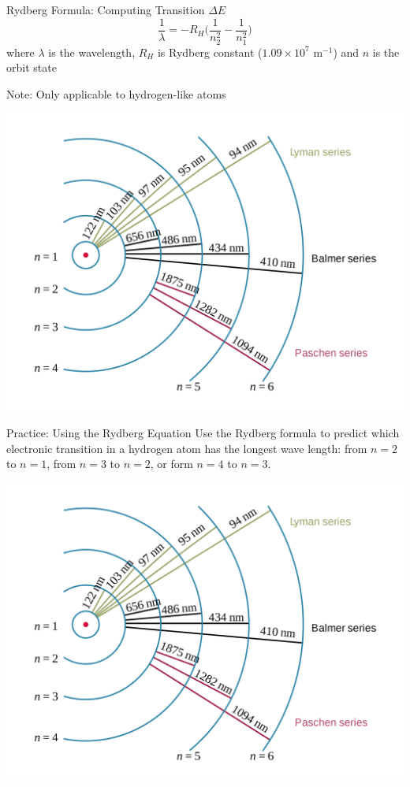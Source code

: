 \documentclass[11pt]{beamer}
\begin{document}
\begin{frame}{Rydberg Formula: Computing Transition $\Delta E$}
  \begin{equation}
    \frac{1}{\lambda} = -R_H\Bigg(\frac{1}{n_2^2} - \frac{1}{n_1^2}\Bigg)
  \end{equation}
  where $\lambda$ is the wavelength, $R_H$ is Rydberg constant
  ($1.09\times 10^7$ m$^{-1}$) and $n$ is the orbit state

  Note: Only applicable to hydrogen-like atoms
  \begin{center}
    \includegraphics[scale=0.07]{h_spectra}
  \end{center}
\end{frame}

\begin{frame}{Practice: Using the Rydberg Equation}
  Use the Rydberg formula to predict which electronic transition in
  a hydrogen atom has the longest wave length: from $n = 2$ to $n = 1$,
  from $n = 3$ to $n = 2$, or form $n = 4$ to $n = 3$.
  \begin{center}
    \includegraphics[scale=0.08]{h_spectra}
  \end{center}  
\end{frame}
\end{document}
